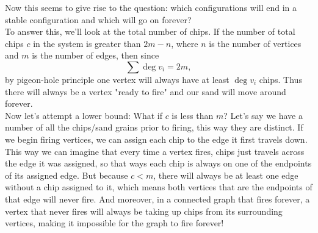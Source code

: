 \documentclass{article}
\begin{document}
Now this seems to give rise to the question: which configurations will end in a stable configuration and which will go on forever? \\

To answer this, we'll look at the total number of chips. If the number of total chips $c$ in the system is greater than $2m-n$, where $n$ is the number of vertices and $m$ is the number of edges, then since $$\sum \deg{v_i}=2m,$$ by pigeon-hole principle one vertex will always have at least $\deg{v_i}$ chips. Thus there will always be a vertex "ready to fire" and our sand will move around forever.\\

Now let's attempt a lower bound: What if $c$ is less than $m$? Let's say we have a number of all the chips/sand grains prior to firing, this way they are distinct. If we begin firing vertices, we can assign each chip to the edge it first travels down. This way we can imagine that every time a vertex fires, chips just travels across the edge it was assigned, so that ways each chip is always on one of the endpoints of its assigned edge. But because $c<m$, there will always be at least one edge without a chip assigned to it, which means both vertices that are the endpoints of that edge will never fire. And moreover, in a connected graph that fires forever, a vertex that never fires will always be taking up chips from its surrounding vertices, making it impossible for the graph to fire forever! \\
\end{document}
